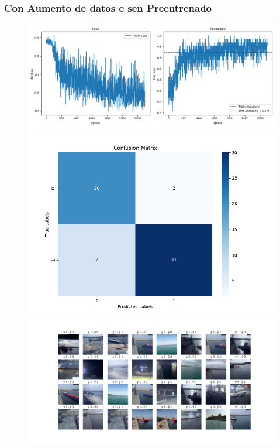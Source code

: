 \documentclass{article}
\begin{document}
\subsubsection{Con Aumento de datos e sen Preentrenado}
\begin{figure}[H]
    \centering
    \begin{minipage}{0.55\textwidth}
        \centering
        \includegraphics[width=\linewidth]{../ultimas_figuras/LOSS__A_True_P_False_D_False_MLP_True_efficientnet_b4.png}
    \end{minipage}
    \begin{minipage}{0.3\textwidth}
        \centering
        \includegraphics[width=\linewidth]{../ultimas_figuras/CM__A_True_P_False_D_False_MLP_True_efficientnet_b4.png}
    \end{minipage}
    \begin{minipage}{0.7\textwidth}
        \centering
        \includegraphics[width=\linewidth]{../ultimas_figuras/GRID__A_True_P_False_D_False_MLP_True_efficientnet_b4.png}
    \end{minipage}
\end{figure}
\end{document}
